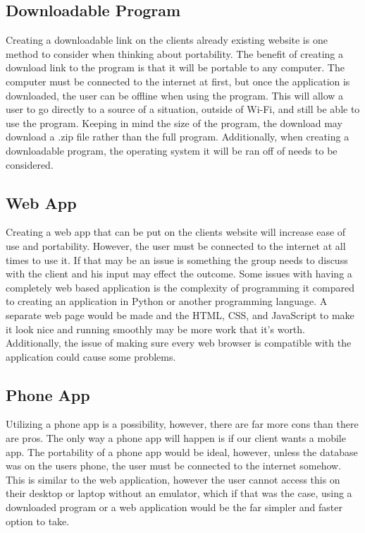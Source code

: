 \documentclass[onecolumn, draftclsnofoot,10pt, compsoc]{IEEEtran}
\begin{document}
    \subsection{Downloadable Program}
    Creating a downloadable link on the clients already existing website is one method to consider when thinking about portability. The benefit of creating a download link to the program is that it will be portable to any computer. The computer must be connected to the internet at first, but once the application is downloaded, the user can be offline when using the program. This will allow a user to go directly to a source of a situation, outside of Wi-Fi, and still be able to use the program. Keeping in mind the size of the program, the download may download a .zip file rather than the full program\cite{downloadsite}. Additionally, when creating a downloadable program, the operating system it will be ran off of needs to be considered. 
    
    \subsection{Web App}
    Creating a web app that can be put on the clients website will increase ease of use and portability. However, the user must be connected to the internet at all times to use it. If that may be an issue is something the group needs to discuss with the client and his input may effect the outcome. Some issues with having a completely web based application is the complexity of programming it compared to creating an application in Python or another programming language. A separate web page would be made and the HTML, CSS, and JavaScript to make it look nice and running smoothly may be more work that it's worth. Additionally, the issue of making sure every web browser is compatible with the application could cause some problems. 
    
    \subsection{Phone App}
    Utilizing a phone app is a possibility, however, there are far more cons than there are pros. The only way a phone app will happen is if our client wants a mobile app. The portability of a phone app would be ideal, however, unless the database was on the users phone, the user must be connected to the internet somehow. This is similar to the web application, however the user cannot access this on their desktop or laptop without an emulator, which if that was the case, using a downloaded program or a web application would be the far simpler and faster option to take. 
    
\end{document}
